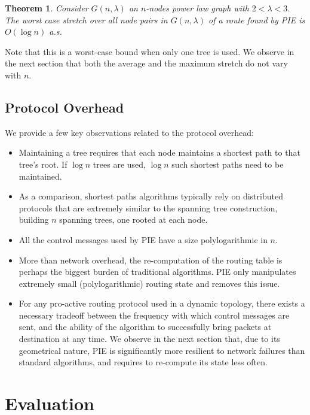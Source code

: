\documentclass[conference]{IEEEtran}
\newtheorem{theorem}{Theorem}[section]
\newcommand{\bTheorem}{ \begin{theorem}  }
\newcommand{\eTheorem}{ \end{theorem}    }
\begin{document}
\bTheorem
Consider $G(n,\lambda)$ an $n$-nodes power law graph with $2 < \lambda < 3$. 
The worst case stretch over all node pairs in $G(n,\lambda)$ of a route found by PIE is $O(\log n)$ a.s.
\eTheorem

Note that this is a worst-case bound when only one tree is used.
We observe in the next section that both the average and the maximum stretch do not vary with $n$.



\subsection{Protocol Overhead}
We provide a few key observations related to the protocol overhead:
\begin{itemize}
 \item Maintaining a tree requires that each node maintains a shortest path to that tree's root. If $\log n$ trees are used, $\log n$ such shortest paths need to be maintained.
 \item As a comparison, shortest paths algorithms typically rely on distributed protocols that are extremely similar to the spanning tree construction, building $n$ spanning trees, one rooted at each node.
 \item All the control messages used by PIE have a size polylogarithmic in $n$.
 \item More than network overhead, the re-computation of the routing table is perhaps the biggest burden of traditional algorithms. PIE only manipulates extremely small (polylogarithmic) routing state and removes this issue.
 \item For any pro-active routing protocol used in a dynamic topology, there exists a necessary tradeoff between the frequency with which control messages are sent, and the ability of the algorithm to successfully bring packets at destination at any time. We observe in the next section that, due to its geometrical nature, PIE is significantly more resilient to network failures than standard algorithms, and requires to re-compute its state less often.
\end{itemize}













\section{Evaluation}
\label{sec:perfeval}
\end{document}
